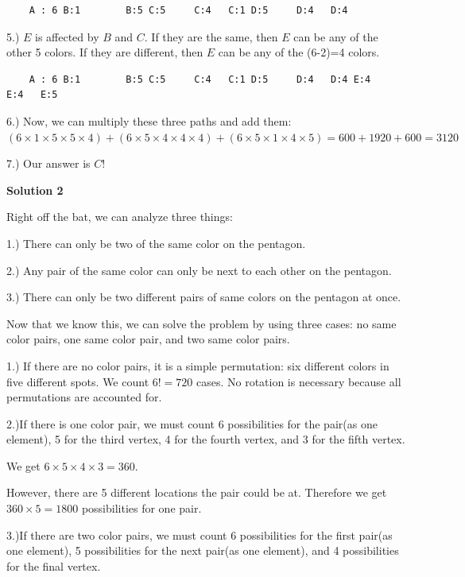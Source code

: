 \begin{enumerate}
 \begin{verbatim}
	A : 6 B:1        B:5 C:5     C:4   C:1 D:5     D:4   D:4
\end{verbatim}

5.) $E$ is affected by $B$ and $C$. If they are the same, then $E$ can be any of the other 5 colors. If they are different, then $E$ can be any of the (6-2)=4 colors.

 \begin{verbatim}
	A : 6 B:1        B:5 C:5     C:4   C:1 D:5     D:4   D:4 E:4     E:4   E:5
\end{verbatim}

6.) Now, we can multiply these three paths and add them:$(6\times1\times5\times5\times4)+(6\times5\times4\times4\times4)+(6\times5\times1\times4\times5) =600+1920+600=3120$

 7.) Our answer is $C$!

 



\textbf{Solution 2}

Right off the bat, we can analyze three things: 

 
1.) There can only be two of the same color on the pentagon.

 2.) Any pair of the same color can only be next to each other on the pentagon.

 3.) There can only be two different pairs of same colors on the pentagon at once.

 
Now that we know this, we can solve the problem by using three cases: no same color pairs,  one same color pair, and two same color pairs.

 
1.) If there are no color pairs, it is a simple permutation: six different colors in five different spots. We count $6!=720$ cases. No rotation is necessary because all permutations are accounted for.

 
2.)If there is one color pair, we must count 6 possibilities for the pair(as one element), 5 for the third vertex, 4 for the fourth vertex, and 3 for the fifth vertex. 

 We get $6\times5\times4\times3=360$.

 However, there are 5 different locations the pair could be at. Therefore we get $360\times5=1800$ possibilities for one pair.

 
3.)If there are two color pairs, we must count 6 possibilities for the first pair(as one element), 5 possibilities for the next pair(as one element), and 4 possibilities for the final vertex.


\end{enumerate}
